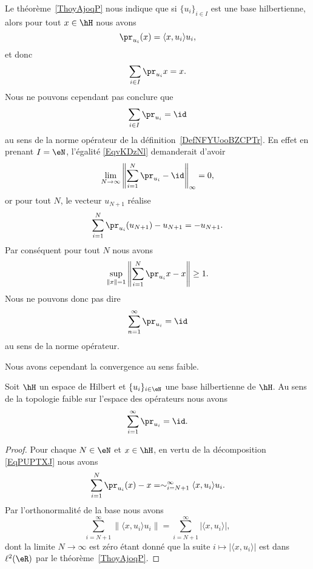 Le théorème~\ref{ThoyAjoqP} nous indique que si \( \{ u_i \}_{i\in I}\) est une base hilbertienne, alors pour tout \( x\in \hH\) nous avons
\begin{equation}
    \pr_{u_i}(x)=\langle x, u_i\rangle u_i,
\end{equation}
et donc
\begin{equation}
    \sum_{i\in I}\pr_{u_i}x=x.
\end{equation}
Nous ne pouvons cependant pas conclure que
\begin{equation}    \label{EqvKDzNl}
    \sum_{i\in I}\pr_{u_i}=\id
\end{equation}
au sens de la norme opérateur de la définition~\ref{DefNFYUooBZCPTr}. En effet en prenant \( I=\eN\), l'égalité \eqref{EqvKDzNl} demanderait d'avoir
\begin{equation}
    \lim_{N\to \infty} \left\| \sum_{i=1}^N\pr_{u_i}-\id \right\|_{\infty}=0,
\end{equation}
or pour tout \( N\), le vecteur \( u_{N+1}\) réalise
\begin{equation}
    \sum_{i=1}^N\pr_{u_i}(u_{N+1})-u_{N+1}=-u_{N+1}.
\end{equation}
Par conséquent pour tout \( N\) nous avons
\begin{equation}
    \sup_{\| x \|=1}\left\| \sum_{i=1}^N\pr_{u_i}x-x \right\|\geq 1.
\end{equation}
Nous ne pouvons donc pas dire
\begin{equation}
    \sum_{n=1}^{\infty}\pr_{u_i}=\id
\end{equation}
au sens de la norme opérateur.

Nous avons cependant la convergence au sens faible.
\begin{proposition}
    Soit \( \hH\) un espace de Hilbert et \( \{ u_i \}_{i\in \eN}\) une base hilbertienne de \( \hH\). Au sens de la topologie faible sur l'espace des opérateurs nous avons
    \begin{equation}
        \sum_{i=1}^{\infty}\pr_{u_i}=\id.
    \end{equation}
\end{proposition}

\begin{proof}
    Pour chaque \( N\in \eN\) et \( x\in\hH\), en vertu de la décomposition \eqref{EqPUPTXJ} nous avons
    \begin{equation}
        \sum_{i=1}^N\pr_{u_i}(x)-x=\sim_{i=N+1}^{\infty}\langle x, u_i\rangle u_i.
    \end{equation}
    Par l'orthonormalité de la base nous avons
    \begin{equation}
        \sum_{i=N+1}^{\infty}\| \langle x, u_i\rangle u_i \|=\sum_{i=N+1}^{\infty}| \langle x, u_i\rangle  |,
    \end{equation}
    dont la limite \( N\to \infty\) est zéro étant donné que la suite \( i\mapsto| \langle x, u_i\rangle  |\) est dans \( \ell^2(\eR)\) par le théorème~\ref{ThoyAjoqP}.
\end{proof}


